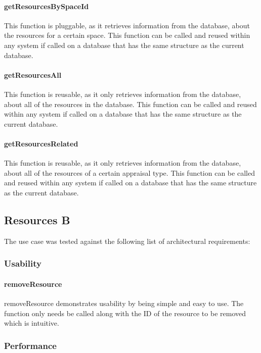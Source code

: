 \documentclass[a4paper]{article}
\begin{document}
\paragraph{getResourcesBySpaceId}
This function is pluggable, as it retrieves information from the database, about the resources for a certain space. This function can be called and reused within any system if called on a database that has the same structure as the current database.

\paragraph{getResourcesAll}
This function is reusable, as it only retrieves information from the database, about all of the resources in the database. This function can be called and reused within any system if called on a database that has the same structure as the current database.

\paragraph{getResourcesRelated}
This function is reusable, as it only retrieves information from the database, about all of the resources of a certain appraisal type. This function can be called and reused within any system if called on a database that has the same structure as the current database.


\subsection {Resources B}
The use case was tested against the following list of architectural requirements:
\subsubsection {Usability}

\paragraph{removeResource}
removeResource demonstrates usability by being simple and easy to use. The function only needs be called along with the ID of the resource to be removed which is intuitive.

\subsubsection {Performance}
\end{document}
